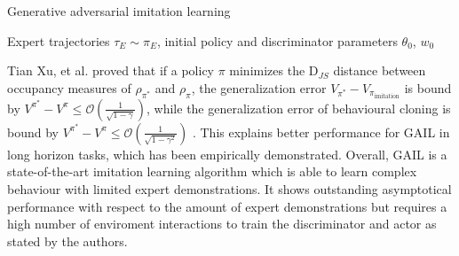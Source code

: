\begin{algorithm}
    \caption{Generative adversarial imitation learning}
    \label{GAIL_Algo}
    \begin{algorithmic}
    \Require Expert trajectories $\tau_E \sim \pi_E$, initial policy and discriminator parameters $\theta_0$, $w_0$\\
    \end{algorithmic}
    \end{algorithm}
Tian Xu, et al. proved that if a policy $\pi$ minimizes the $\text{D}_{JS}$ distance 
between occupancy measures of $\rho_{\pi^*}$ and $\rho_{\pi}$, the generalization error $V_{\pi^*} - V_{\pi_{\text{imitation}}}$ is bound by 
$V^{{\pi^*}} - V^{\pi} \leq \mathcal{O}\left(\frac{1}{\sqrt{1-\gamma}}\right)$, while the generalization error of behavioural cloning is bound by 
$V^{{\pi^*}} - V^{\pi} \leq \mathcal{O}\left(\frac{1}{\sqrt{1-\gamma^2}}\right)$ \cite{NEURIPS2020_b5c01503} . This explains better performance for GAIL in long horizon tasks, which has 
been empirically demonstrated. Overall, GAIL is a state-of-the-art imitation learning algorithm which is able to learn complex behaviour with limited expert demonstrations. It shows outstanding 
asymptotical performance with respect to the amount of expert demonstrations but requires a high number of enviroment interactions to train the discriminator and actor as stated by the authors. 

